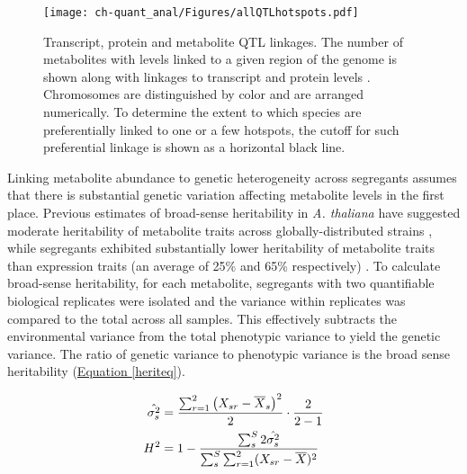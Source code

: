 \begin{figure}[h!]
\begin{center}
\texttt{[image: ch-quant\_anal/Figures/allQTLhotspots.pdf]}
\caption[Transcript, protein and metabolite QTL linkages]{Transcript, protein and metabolite QTL linkages. The number of metabolites with levels linked to a given region of the genome is shown along with linkages to transcript and protein levels \cite{Brem:2005gh, Foss:2007ej}. Chromosomes are distinguished by color and are arranged numerically. To determine the extent to which species are preferentially linked to one or a few hotspots, the cutoff for such preferential linkage is shown as a horizontal black line.}
\label{ch-quant_anal:qtlHotspots}
\end{center}
\end{figure}

Linking metabolite abundance to genetic heterogeneity across segregants assumes that there is substantial genetic variation affecting metabolite levels in the first place.  Previous estimates of broad-sense heritability \cite{Lynch:1998vx} in \textit{A. thaliana} have suggested moderate heritability of metabolite traits across globally-distributed strains \cite{Keurentjes:2006ik}, while segregants exhibited substantially lower heritability of metabolite traits than expression traits (an average of 25\% and 65\% respectively) \cite{Rowe:2008ty, West:2006bk}.  To calculate broad-sense heritability, for each metabolite, segregants with two quantifiable biological replicates were isolated and the variance within replicates was compared to the total across all samples.  This effectively subtracts the environmental variance from the total phenotypic variance to yield the genetic variance.  The ratio of genetic variance to phenotypic variance is the broad sense heritability (\hyperref[heriteq]{Equation \ref{heriteq}}).

\large{
\begin{align}
\hat{\sigma^{2}_{s}} &= \frac{\sum_{r = 1}^{2}\left(X_{sr} - \overline{X}_{s}\right)^2}{2} \cdot \frac{2}{2 - 1}\notag\\
H^{2} &= 1 -  \frac{\sum_{s}^{S}2\hat{\sigma^{2}_{s}}}{\sum_{s}^{S}\sum_{r = 1}^{2}(X_{sr} - \overline{X})^2}\label{heriteq}
\end{align}
}


